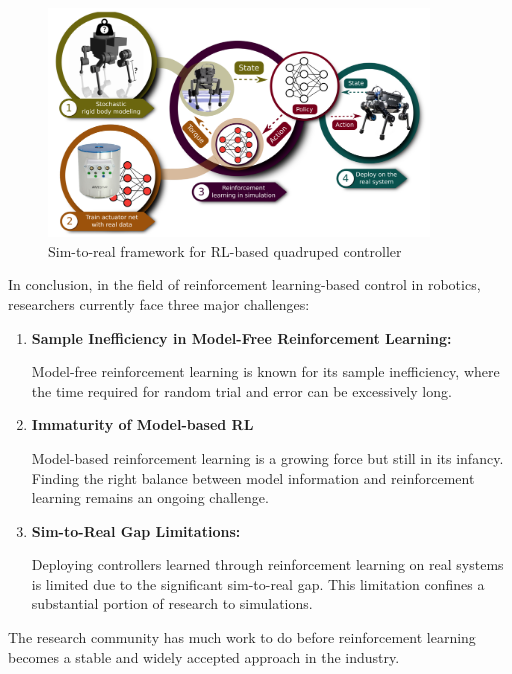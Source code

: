\begin{figure}[H]
  \centering
  \includegraphics[width=0.9\textwidth]{figures/quadruped_sim2real.png} %
  \caption{Sim-to-real framework for RL-based quadruped controller\cite{hwangbo2019learning}}
  \label{fig:benchmarking MBRL}
\end{figure}

In conclusion, in the field of reinforcement learning-based control in robotics, researchers currently face three major challenges:

\begin{enumerate}
    \item \textbf{Sample Inefficiency in Model-Free Reinforcement Learning:}
    
    Model-free reinforcement learning is known for its sample inefficiency, where the time required for random trial and error can be excessively long.
    
    \item \textbf{Immaturity of Model-based RL} 
    
    Model-based reinforcement learning is a growing force but still in its infancy. Finding the right balance between model information and reinforcement learning remains an ongoing challenge.
    
    \item \textbf{Sim-to-Real Gap Limitations:} 
    
    Deploying controllers learned through reinforcement learning on real systems is limited due to the significant sim-to-real gap. This limitation confines a substantial portion of research to simulations.
\end{enumerate}

The research community has much work to do before reinforcement learning becomes a stable and widely accepted approach in the industry.


\cleardoublepage
